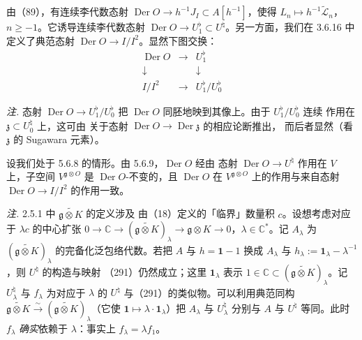 由（89），有连续李代数态射
$\operatorname{Der}O\to h^{-1}J_I\subset A[h^{-1}]$，使得
$L_n\mapsto h^{-1}\widetilde{\mathcal{L}}_n$，$n\ge -1$。它诱导连续李代数态射
$\operatorname{Der}O\to U^{\flat}_1\subset U^{\natural}$。另一方面，我们在
3.6.16 中定义了典范态射 $\operatorname{Der}O\to I/I^{2}$。显然下图交换：
\[
\begin{array}{ccc}
\operatorname{Der}O & \longrightarrow & U^{\flat}_1\\[2pt]
\downarrow & & \downarrow\\[2pt]
I/I^{2} & \longrightarrow & U^{\flat}_1/U^{\flat}_0
\end{array}
\]

\emph{注.} 态射 $\operatorname{Der}O\to U^{\flat}_1/U^{\flat}_0$ 把
$\operatorname{Der}O$ 同胚地映到其像上。由于 $U^{\flat}_1/U^{\flat}_0$ 连续
作用在 $\mathfrak{z}\subset U^{\natural}_0$ 上，这可由
关于态射 $\operatorname{Der}O\to\operatorname{Der}\mathfrak{z}$ 的相应论断推出，
而后者显然（看 $\mathfrak{z}$ 的 Sugawara 元素）。

 设我们处于 5.6.8 的情形。由 5.6.9，$\operatorname{Der}O$ 经由
态射 $\operatorname{Der}O\to U^{\natural}$ 作用在 $V$ 上，子空间
$V^{\mathfrak{g}\otimes O}$ 是 $\operatorname{Der}O$-不变的，且
$\operatorname{Der}O$ 在 $V^{\mathfrak{g}\otimes O}$ 上的作用与来自态射
$\operatorname{Der}O\to I/I^{2}$ 的作用一致。

 \emph{注.} 2.5.1 中 $\widetilde{\mathfrak{g}\otimes K}$ 的定义涉及
由（18）定义的「临界」数量积 $c$。设想考虑对应于 $\lambda c$ 的中心扩张
$0\to\mathbb{C}\to(\widetilde{\mathfrak{g}\otimes K})_{\lambda}\to
\mathfrak{g}\otimes K\to 0$，$\lambda\in\mathbb{C}^{*}$。记 $A_{\lambda}$ 为
$(\widetilde{\mathfrak{g}\otimes K})_{\lambda}$ 的完备化泛包络代数。若把 $A$ 与
$h=\mathbf{1}-1$ 换成 $A_{\lambda}$ 与
$h_{\lambda}:=\mathbf{1}_{\lambda}-\lambda^{-1}$，则 $U^{\natural}$ 的构造与映射
（291）仍然成立；这里 $\mathbf{1}_{\lambda}$ 表示
$1\in\mathbb{C}\subset(\widetilde{\mathfrak{g}\otimes K})_{\lambda}$。记
$U^{\natural}_{\lambda}$ 与 $f_{\lambda}$ 为对应于 $\lambda$ 的
$U^{\natural}$ 与（291）的类似物。可以利用典范同构
$\widetilde{\mathfrak{g}\otimes K}\xrightarrow{\sim}
(\widetilde{\mathfrak{g}\otimes K})_{\lambda}$（它使
$\mathbf{1}\mapsto\lambda\cdot\mathbf{1}_{\lambda}$）把 $A_{\lambda}$ 与
$U^{\natural}_{\lambda}$ 分别与 $A$ 与 $U^{\natural}$ 等同。此时 $f_{\lambda}$
\emph{确实}依赖于 $\lambda$：事实上 $f_{\lambda}=\lambda f_1$。

